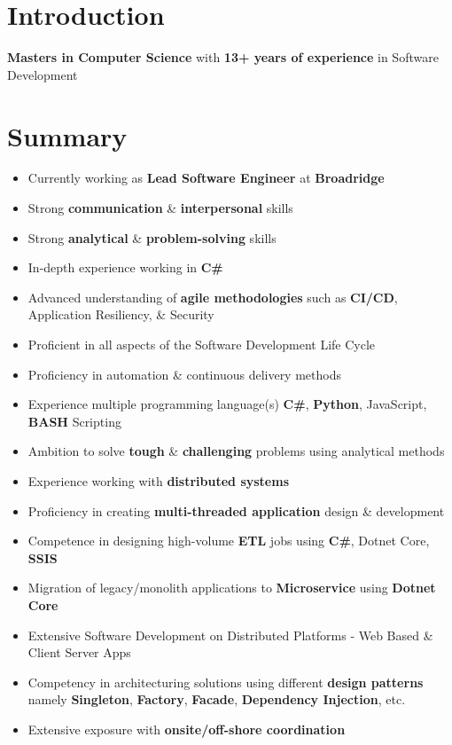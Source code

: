 \documentclass[letterpaper,11pt]{article}
\begin{document}
\section{Introduction}
\textbf{Masters in Computer Science} with \textbf{13+ years of experience} in Software Development

\section{Summary}
\begin{itemize}
    \item Currently working as \textbf{Lead Software Engineer} at \textbf{Broadridge}
    \item Strong \textbf{communication} \& \textbf{interpersonal} skills
    \item Strong \textbf{analytical} \& \textbf{problem-solving} skills
    \item In-depth experience working in \textbf{C\#}
    \item Advanced understanding of \textbf{agile methodologies} such as \textbf{CI/CD}, Application Resiliency, \& Security
    \item Proficient in all aspects of the Software Development Life Cycle
    \item Proficiency in automation \& continuous delivery methods
    \item Experience multiple programming language(s) \textbf{C\#}, \textbf{Python}, JavaScript, \textbf{BASH} Scripting
    \item Ambition to solve \textbf{tough} \& \textbf{challenging} problems using analytical methods
    \item Experience working with \textbf{distributed systems}
    \item Proficiency in creating \textbf{multi-threaded application} design \& development
    \item Competence in designing high-volume \textbf{ETL} jobs using \textbf{C\#}, Dotnet Core, \textbf{SSIS}
    \item Migration of legacy/monolith applications to \textbf{Microservice} using \textbf{Dotnet Core}
    \item Extensive Software Development on Distributed Platforms - Web Based \& Client Server Apps
    \item Competency in architecturing solutions using different \textbf{design patterns} namely \textbf{Singleton}, \textbf{Factory}, \textbf{Facade}, \textbf{Dependency Injection}, etc.
    \item Extensive exposure with \textbf{onsite/off-shore coordination}

\end{itemize}
\end{document}
